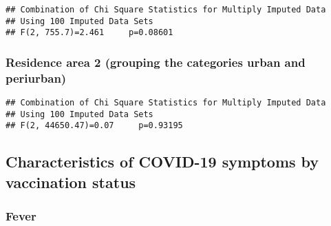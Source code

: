 \documentclass[
]{article}
\newenvironment{Shaded}{\begin{snugshade}}{\end{snugshade}}
\newcommand{\AttributeTok}[1]{\textcolor[rgb]{0.77,0.63,0.00}{#1}}
\newcommand{\ConstantTok}[1]{\textcolor[rgb]{0.00,0.00,0.00}{#1}}
\newcommand{\ControlFlowTok}[1]{\textcolor[rgb]{0.13,0.29,0.53}{\textbf{#1}}}
\newcommand{\DecValTok}[1]{\textcolor[rgb]{0.00,0.00,0.81}{#1}}
\newcommand{\FunctionTok}[1]{\textcolor[rgb]{0.00,0.00,0.00}{#1}}
\newcommand{\NormalTok}[1]{#1}
\newcommand{\OtherTok}[1]{\textcolor[rgb]{0.56,0.35,0.01}{#1}}
\newcommand{\SpecialCharTok}[1]{\textcolor[rgb]{0.00,0.00,0.00}{#1}}
\begin{document}
\begin{verbatim}
## Combination of Chi Square Statistics for Multiply Imputed Data
## Using 100 Imputed Data Sets
## F(2, 755.7)=2.461     p=0.08601
\end{verbatim}

\hypertarget{residence-area-2-grouping-the-categories-urban-and-periurban-1}{%
\subsubsection{Residence area 2 (grouping the categories urban and
periurban)}\label{residence-area-2-grouping-the-categories-urban-and-periurban-1}}

\begin{Shaded}
\end{Shaded}

\begin{verbatim}
## Combination of Chi Square Statistics for Multiply Imputed Data
## Using 100 Imputed Data Sets
## F(2, 44650.47)=0.07     p=0.93195
\end{verbatim}

\hypertarget{characteristics-of-covid-19-symptoms-by-vaccination-status}{%
\subsection{Characteristics of COVID-19 symptoms by vaccination
status}\label{characteristics-of-covid-19-symptoms-by-vaccination-status}}

\hypertarget{fever-1}{%
\subsubsection{Fever}\label{fever-1}}
\end{document}
